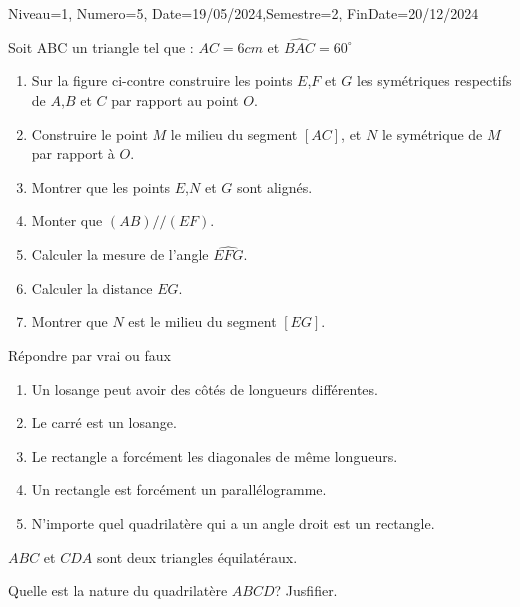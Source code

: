 \documentclass[a4paper,12pt]{article}
\begin{document}
\begin{Maquette}[DM]{Niveau=1, Numero=5, Date=19/05/2024,Semestre=2, FinDate=20/12/2024}

\begin{exercice}
Soit ABC un triangle tel que : $AC=6cm$ et $\widehat{BAC}=60^{\circ}$
\begin{enumerate}
\item Sur la figure ci-contre construire les points $E$,$F$ et $G$ les symétriques respectifs de $A$,$B$ et $C$ par rapport au point $O$.
\item Construire le point $M$ le milieu du segment $[AC]$, et $N$ le symétrique de $M$ par rapport à $O$.
\item Montrer que les points $E$,$N$ et $G$ sont alignés.
\item Monter que $(AB)//(EF)$.
\item Calculer la mesure de l'angle $\widehat{EFG}$.
\item Calculer la distance $EG$.
\item Montrer que $N$ est le milieu du segment $[EG]$.
\end{enumerate}
\end{exercice}

\begin{exercice}
Répondre par vrai ou faux
\begin{enumerate}
\item Un losange peut avoir des côtés de longueurs différentes.
\item Le carré est un losange.
\item Le rectangle a forcément les diagonales de même longueurs.
\item Un rectangle est forcément un parallélogramme.
\item N'importe quel quadrilatère qui a un angle droit est un rectangle.
\end{enumerate}
\end{exercice}

\begin{exercice}
\begin{minipage}{.58\linewidth}
$ABC$ et $CDA$ sont deux triangles équilatéraux.

Quelle est la nature du quadrilatère $ABCD$? Jusfifier.
\end{minipage}
\begin{minipage}{.4\linewidth}
\end{minipage}
\end{exercice}
\end{Maquette}
\end{document}
